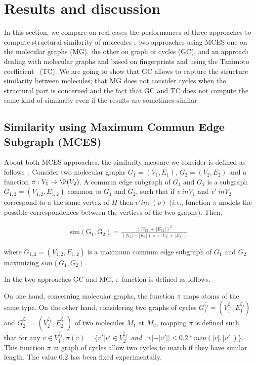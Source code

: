 \documentclass[10pt,letterpaper]{article}
\begin{document}
\section*{Results and discussion}

In this section, we compare on real cases the performances of three   approaches to compute structural similarity of molecules  : two approaches using MCES one on the molecular graphs (MG), the other on graph of cycles (GC), and an approach dealing with molecular graphs  and based on fingerprints and using the Tanimoto coefficient~\cite{Tanimoto1960} (TC). We are going to show that GC allows to capture the structure similarity between molecules; that MG does not consider cycles when the structural part is concerned and the fact that GC and TC does not compute the same  kind of similarity even if the results are sometimes similar.

\subsection*{Similarity using Maximum Commun Edge Subgraph (MCES)}



About both MCES approaches,  the similarity measure we consider is defined as follows~\cite{Raymond2002}. Consider two molecular graphs $G_1=(V_1,E_1)$, $G_2=(V_2,E_2)$ and a function $\pi: V_1 \rightarrow {\P}(V_2)$. A commun edge subgraph of $G_ {1}$ and $G_ {2}$ is a subgraph $G_{1,2}=(V_{1,2},E_{1,2})$ common to $G_ {1}$ and $G_ {2}$, such that if $ v \ in V_1 $ and $ v '\ in V_2 $ correspond to a the same vertex of $H$ then $ v 'in \pi (v) $ ({\it i.e.}, function $ \pi $ models the possible correspondences between the vertices of the two graphs). Then,

\begin{eqnarray}
\mathrm{sim(G_{1},G_{2}) }= \frac{(|V _{12}| + |E _{12}| )^2 }{(|V _1| + |E_1| )\times (|V_2| + |E _2| )}
\label{eq:mces}
\end{eqnarray}

where   $G_{1,2}=(V_{1,2},E_{1,2})$ is a maximum commun edge subgraph of  $G_ {1}$ and $G_ {2}$ maximizing $sim(G_{1},G_{2})$.

In the two approaches GC and MG, $\pi$ function is defined as follows.

On one hand, concerning  molecular graphs, the function $\pi$ maps atoms of the same type. On the other hand, considering two  graphs of cycles  $G^{\zeta_j}_1= (V^{\zeta_j}_1,E^{\zeta_j}_1)$ and $G^{\zeta_{j'}}_2= (V^{\zeta_{j'}}_2,E^{\zeta_{j'}}_2)$ of two molecules $M_1$ et $M_2$, mapping $\pi$ is defined such that  for any $v \in V^{\zeta_j}_1, \pi(v)= \{ v' | v' \in V^{\zeta_{j'}}_2$ \textit{and} $  | |v| -|v'|| \leq 0.2 *min (  |v|,|v'| )\}$. This function $\pi$ in graph of cycles allow two cycles to match if they have similar length. The value $0.2$ has been fixed experimentally.
\end{document}
